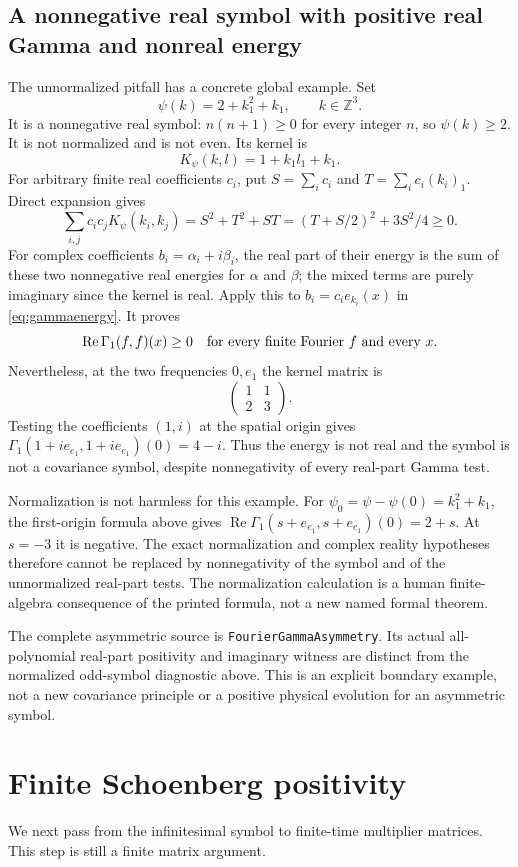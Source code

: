 \documentclass[11pt]{article}
\theoremstyle{remark}\newtheorem{remark}[theorem]{Remark}
\newcommand{\Z}{\mathbb Z}\newcommand{\T}{\mathbb T}
\newcommand{\code}[1]{{\small\nolinkurl{#1}}}
\begin{document}
\subsection*{A nonnegative real symbol with positive real Gamma and nonreal energy}
The unnormalized pitfall has a concrete global example. Set
\[
 \psi(k)=2+k_1^2+k_1,\qquad k\in\Z^3.
\]
It is a nonnegative real symbol: $n(n+1)\geq0$ for every integer $n$,
so $\psi(k)\geq2$. It is not normalized and is not even.
Its kernel is
\[
 K_\psi(k,l)=1+k_1l_1+k_1.
\]
For arbitrary finite real coefficients $c_i$, put
$S=\sum_i c_i$ and $T=\sum_i c_i(k_i)_1$. Direct expansion gives
\[
 \sum_{i,j}c_ic_jK_\psi(k_i,k_j)
 =S^2+T^2+ST=(T+S/2)^2+3S^2/4\geq0.
\]
For complex coefficients $b_i=\alpha_i+i\beta_i$, the real part of
their energy is the sum of these two nonnegative real energies for
$\alpha$ and $\beta$; the mixed terms are purely imaginary since
the kernel is real. Apply this to
$b_i=c_i e_{k_i}(x)$ in \eqref{eq:gammaenergy}. It proves
\[
 \operatorname{Re}\Gamma_1(f,f)(x)\geq0
       \quad\hbox{for every finite Fourier }f\hbox{ and every }x.
\]
Nevertheless, at the two frequencies $0,e_1$ the kernel matrix is
\[
 \begin{pmatrix}1&1\\2&3\end{pmatrix}.
\]
Testing the coefficients $(1,i)$ at the spatial origin gives
$\Gamma_1(1+ie_{e_1},1+ie_{e_1})(0)=4-i$.
Thus the energy is not real and the symbol is not a covariance symbol,
despite nonnegativity of every real-part Gamma test.

Normalization is not harmless for this example. For
$\psi_0=\psi-\psi(0)=k_1^2+k_1$, the first-origin formula above
gives $\operatorname{Re}\Gamma_1(s+e_{e_1},s+e_{e_1})(0)=2+s$.
At $s=-3$ it is negative. The exact normalization and complex reality
hypotheses therefore cannot be replaced by nonnegativity of the
symbol and of the unnormalized real-part tests. The normalization
calculation is a human finite-algebra consequence of the printed
formula, not a new named formal theorem.

\par\noindent
The complete asymmetric source is \code{FourierGammaAsymmetry}.
Its actual all-polynomial real-part positivity and imaginary witness
are distinct from the normalized odd-symbol diagnostic above. This
is an explicit boundary example, not a new covariance principle or
a positive physical evolution for an asymmetric symbol.

\section{Finite Schoenberg positivity}
We next pass from the infinitesimal symbol to finite-time
multiplier matrices. This step is still a finite matrix argument.
\end{document}
